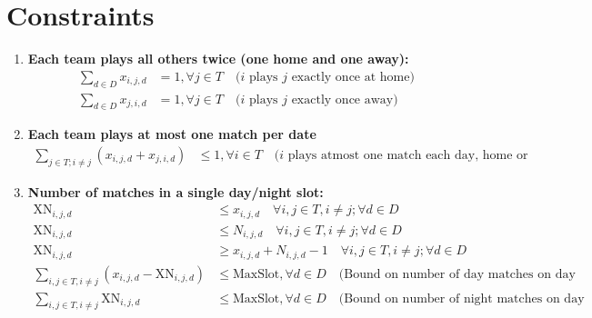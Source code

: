 \documentclass[a4paper, 12pt]{article}
\begin{document}



\section*{Constraints}
\begin{enumerate}
    \item \textbf{Each team plays all others twice (one home and one away):}
    \begin{align*}
        \sum_{d \in D} x_{i,j,d} &= 1 , \forall j \in T \quad \text{($i$ plays $j$ exactly once at home)}\\
        \sum_{d \in D} x_{j,i,d} &= 1 , \forall j \in T \quad \text{($i$ plays $j$ exactly once away)}
    \end{align*}

    \item \textbf{Each team plays at most one match per date}
    \begin{align*}
        \sum_{j \in T; i \neq j} (x_{i,j,d} + x_{j,i,d}) &\leq 1, \forall i \in T \quad \text{($i$ plays atmost one match each day, home or away)}
    \end{align*}

    \item \textbf{Number of matches in a single day/night slot:}
    \begin{align*}
        \text{XN}_{i,j,d} &\leq x_{i,j,d} \quad \forall i,j \in T, i \neq j; \forall d \in D\\
        \text{XN}_{i,j,d} &\leq N_{i,j,d} \quad \forall i,j \in T, i \neq j; \forall d \in D\\
        \text{XN}_{i,j,d} &\geq x_{i,j,d} + N_{i,j,d} - 1 \quad \forall i,j \in T, i \neq j; \forall d \in D\\
        \sum_{i,j \in T, i \neq j} (x_{i,j,d} -\text{XN}_{i,j,d}) &\leq \text{MaxSlot}, \forall d \in D \quad \text{(Bound on number of day matches on day d)}\\
        \sum_{i,j \in T, i \neq j} \text{XN}_{i,j,d} &\leq \text{MaxSlot}, \forall d \in D \quad \text{(Bound on number of night matches on day d)}
    \end{align*}


\end{enumerate}
\end{document}
